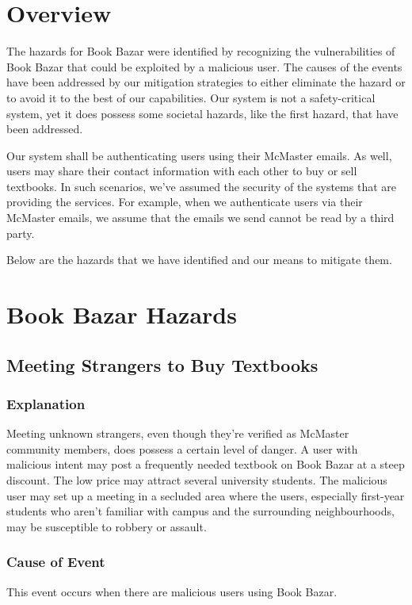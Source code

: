 \documentclass[fullpage]{article}
\begin{document}
\section{Overview}

The hazards for Book Bazar were identified by recognizing the vulnerabilities of Book Bazar that could be exploited by a malicious user. The causes of the events have been addressed by our mitigation strategies to either eliminate the hazard or to avoid it to the best of our capabilities. Our system is not a safety-critical system, yet it does possess some societal hazards, like the first hazard, that have been addressed.

Our system shall be authenticating users using their McMaster emails. As well, users may share their contact information with each other to buy or sell textbooks. In such scenarios, we've assumed the security of the systems that are providing the services. For example, when we authenticate users via their McMaster emails, we assume that the emails we send cannot be read by a third party.

Below are the hazards that we have identified and our means to mitigate them.

\section{Book Bazar Hazards}

\subsection{Meeting Strangers to Buy Textbooks}
\subsubsection*{Explanation}
Meeting unknown strangers, even though they're verified as McMaster community members, does possess a certain level of danger. A user with malicious intent may post a frequently needed textbook on Book Bazar at a steep discount. The low price may attract several university students. The malicious user may set up a meeting in a secluded area where the users, especially first-year students who aren't familiar with campus and the surrounding neighbourhoods, may be susceptible to robbery or assault.

\subsubsection*{Cause of Event}
This event occurs when there are malicious users using Book Bazar.
\end{document}
